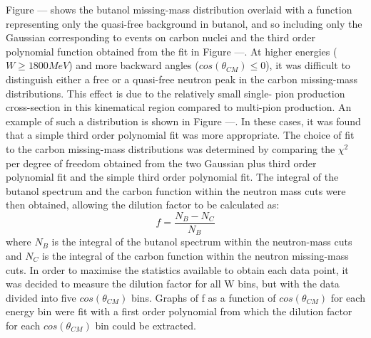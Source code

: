 Figure --- shows the butanol missing-mass distribution overlaid with a function representing only the quasi-free background in butanol, and so including only the Gaussian corresponding to events on carbon nuclei and the third order polynomial function obtained from the fit in Figure ---.
At higher energies ($W\geq 1800 MeV$) and more backward angles ($cos(\theta_{CM}) \leq 0$), it was difficult to distinguish either a free or a quasi-free neutron peak in the carbon missing-mass distributions. This effect is due to the relatively small single- pion production cross-section in this kinematical region compared to multi-pion production. An example of such a distribution is shown in Figure ---. In these cases, it was found that a simple third order polynomial fit was more appropriate.
The choice of fit to the carbon missing-mass distributions was determined by comparing the $\chi^2$ per degree of freedom obtained from the two Gaussian plus third order polynomial fit and the simple third order polynomial fit.
The integral of the butanol spectrum and the carbon function within the neutron mass cuts  were then obtained, allowing the dilution factor to be calculated as:
$$
f = \frac{N_B - N_C}{N_B}
$$
where $N_B$ is the integral of the butanol spectrum within the neutron-mass cuts and $N_C$ is the integral of the carbon function within the neutron missing-mass cuts. In order to maximise the statistics available to obtain each data point, it was decided to measure the dilution factor for all W bins, but with the data divided into five $cos(\theta_{CM})$ bins. Graphs of f as a function of $cos(\theta_{CM})$ for each energy bin were fit with a first order polynomial from which the dilution factor for each $cos(\theta_{CM})$  bin could be extracted.
 
